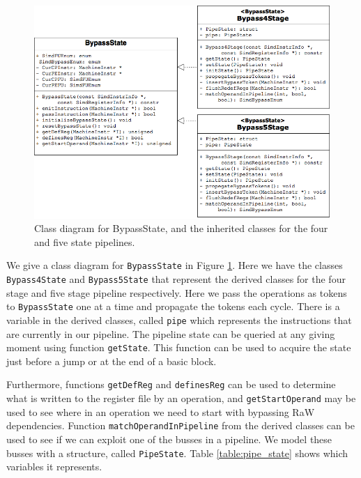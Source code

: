 \begin{figure}[t]
\centering
\includegraphics[width=\textwidth]{figures/class_diag_bpstate}
\caption{Class diagram for BypassState, and the inherited classes for the four and five state pipelines.}
\label{fig:class_diagram_bpstate}
\end{figure}

We give a class diagram for \texttt{BypassState} in Figure \ref{fig:class_diagram_bpstate}. Here we have the classes  \texttt{Bypass4State} and \texttt{Bypass5State} that represent the derived classes for the four stage and five stage pipeline respectively. Here we pass the operations as tokens to \texttt{BypassState} one at a time and propagate the tokens each cycle. There is a variable in the derived classes, called \texttt{pipe} which represents the instructions that are currently in our pipeline. The pipeline state can be queried at any giving moment using function \texttt{getState}. This function can be used to acquire the state just before a jump or at the end of a basic block.

Furthermore, functions \texttt{getDefReg} and \texttt{definesReg} can be used to determine what is written to the register file by an operation, and \texttt{getStartOperand} may be used to see where in an operation we need to start with bypassing RaW dependencies. Function \texttt{matchOperandInPipeline} from the derived classes can be used to see if we can exploit one of the busses in a pipeline. We model these busses with a structure, called \texttt{PipeState}. Table \ref{table:pipe_state} shows which variables it represents.

